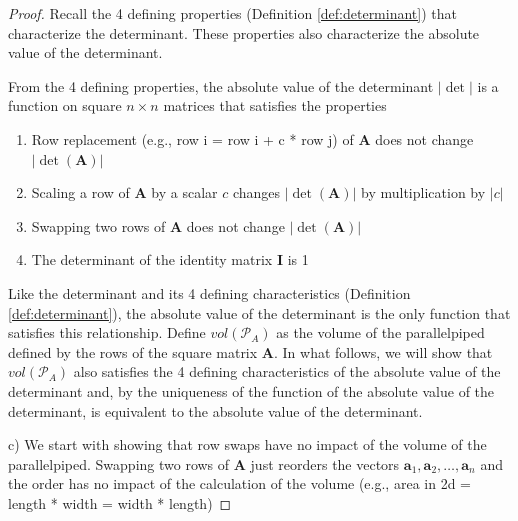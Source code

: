 \documentclass[
]{book}
\theoremstyle{definition}
\theoremstyle{definition}
\theoremstyle{definition}
\theoremstyle{definition}
\theoremstyle{remark}
\begin{document}
\begin{proof}
Recall the 4 defining properties (Definition \ref{def:determinant}) that characterize the determinant. These properties also characterize the absolute value of the determinant.

From the 4 defining properties, the absolute value of the determinant \(|\det|\) is a function on square \(n \times n\) matrices that satisfies the properties

\begin{enumerate}
\def\labelenumi{\alph{enumi})}
\item
  Row replacement (e.g., row i = row i + c * row j) of \(\mathbf{A}\) does not change \(|\det(\mathbf{A})|\)
\item
  Scaling a row of \(\mathbf{A}\) by a scalar \(c\) changes \(|\det(\mathbf{A})|\) by multiplication by \(|c|\)
\item
  Swapping two rows of \(\mathbf{A}\) does not change \(|\det(\mathbf{A})|\)
\item
  The determinant of the identity matrix \(\mathbf{I}\) is 1
\end{enumerate}

Like the determinant and its 4 defining characteristics (Definition \ref{def:determinant}), the absolute value of the determinant is the only function that satisfies this relationship. Define \(vol(\mathcal{P}_A)\) as the volume of the parallelpiped defined by the rows of the square matrix \(\mathbf{A}\). In what follows, we will show that \(vol(\mathcal{P}_A)\) also satisfies the 4 defining characteristics of the absolute value of the determinant and, by the uniqueness of the function of the absolute value of the determinant, is equivalent to the absolute value of the determinant.

c) We start with showing that row swaps have no impact of the volume of the parallelpiped. Swapping two rows of \(\mathbf{A}\) just reorders the vectors \(\mathbf{a}_1, \mathbf{a}_2, \ldots, \mathbf{a}_n\) and the order has no impact of the calculation of the volume (e.g., area in 2d = length * width = width * length)


\end{proof}
\end{document}
